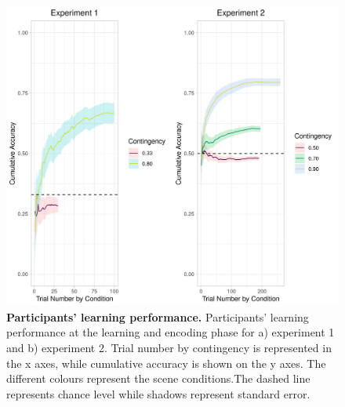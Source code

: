 \documentclass[a4paper,12pt]{article}
\begin{document}
\begin{figure}[ht!]
\centerline
{\includegraphics[width=1\textwidth]{figures/cumAccbySceneAll.jpg}}
\caption{\textbf{Participants' learning performance.} Participants' learning performance at the learning and encoding phase for a) experiment 1 and b) experiment 2. Trial number by contingency is represented in the x axes, while cumulative accuracy is shown on the y axes. The different colours represent the scene conditions.The dashed line represents chance level while shadows represent standard error.}
\label{fig:participantsLer}
\end{figure}
\end{document}
